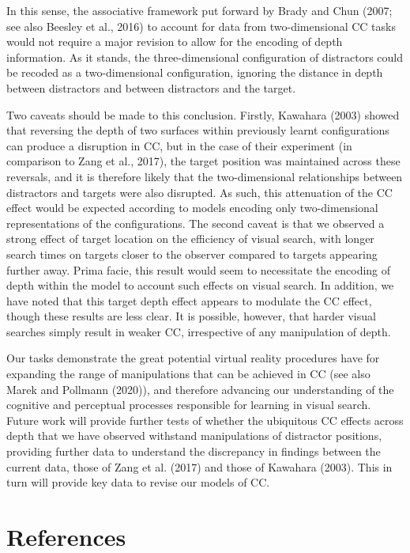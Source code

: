 \documentclass[
  english,
  man,floatsintext]{apa7}
\begin{document}
In this sense, the associative framework put forward by Brady and Chun (2007; see also Beesley et al., 2016) to account for data from two-dimensional CC tasks would not require a major revision to allow for the encoding of depth information. As it stands, the three-dimensional configuration of distractors could be recoded as a two-dimensional configuration, ignoring the distance in depth between distractors and between distractors and the target.

Two caveats should be made to this conclusion. Firstly, Kawahara (2003) showed that reversing the depth of two surfaces within previously learnt configurations can produce a disruption in CC, but in the case of their experiment (in comparison to Zang et al., 2017), the target position was maintained across these reversals, and it is therefore likely that the two-dimensional relationships between distractors and targets were also disrupted. As such, this attenuation of the CC effect would be expected according to models encoding only two-dimensional representations of the configurations. The second caveat is that we observed a strong effect of target location on the efficiency of visual search, with longer search times on targets closer to the observer compared to targets appearing further away. Prima facie, this result would seem to necessitate the encoding of depth within the model to account such effects on visual search. In addition, we have noted that this target depth effect appears to modulate the CC effect, though these results are less clear. It is possible, however, that harder visual searches simply result in weaker CC, irrespective of any manipulation of depth.

Our tasks demonstrate the great potential virtual reality procedures have for expanding the range of manipulations that can be achieved in CC (see also Marek and Pollmann (2020)), and therefore advancing our understanding of the cognitive and perceptual processes responsible for learning in visual search. Future work will provide further tests of whether the ubiquitous CC effects across depth that we have observed withstand manipulations of distractor positions, providing further data to understand the discrepancy in findings between the current data, those of Zang et al. (2017) and those of Kawahara (2003). This in turn will provide key data to revise our models of CC.

\newpage

\hypertarget{references}{%
\section*{References}\label{references}}
\end{document}
